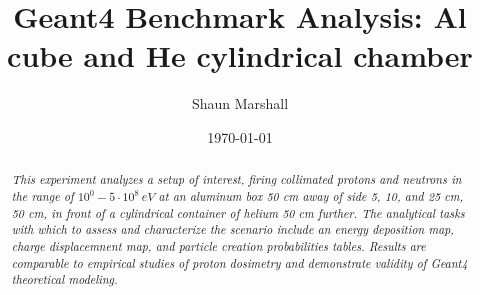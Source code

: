 \documentclass[11pt]{article}
\title{Geant4 Benchmark Analysis: Al cube and He cylindrical chamber}
\author{Shaun Marshall}
\date{\today}
\begin{document}
\maketitle

\begin{abstract}\emph{
This experiment analyzes a setup of interest, firing collimated protons and neutrons in the range of $10^0-5\cdot10^8\ eV$ at an aluminum box 50 cm away of side 5, 10, and 25 cm, 50 cm, in front of a cylindrical container of helium 50 cm further.  The analytical tasks with which to assess and characterize the scenario include an energy deposition map, charge displacemnent map, and particle creation probabilities tables.  Results are comparable to empirical studies of proton dosimetry and demonstrate validity of Geant4 theoretical modeling.
}\end{abstract}
\end{document}
